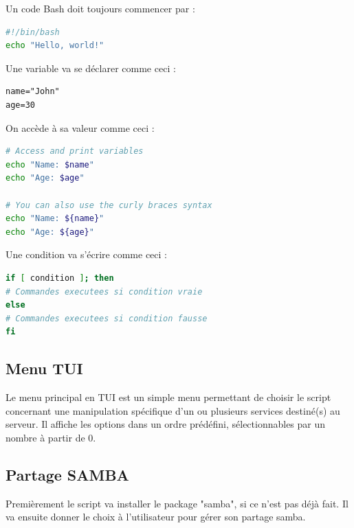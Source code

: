 \documentclass{article}
\begin{document}
	\begin{center}
	Un code Bash doit toujours commencer par :
\end{center}
\begin{lstlisting}[language=bash, label={lst:bash-script}]
#!/bin/bash
echo "Hello, world!"
\end{lstlisting}
	
	\begin{center}
		Une variable va se déclarer comme ceci :
	\end{center}
	\begin{lstlisting}
name="John"
age=30
	\end{lstlisting}

	\begin{center}
On accède à sa valeur comme ceci :
\end{center}

\begin{lstlisting}[language=bash, label={lst:bash-script}]
# Access and print variables
echo "Name: $name"
echo "Age: $age"

# You can also use the curly braces syntax
echo "Name: ${name}"
echo "Age: ${age}"
\end{lstlisting}

\begin{center}
	Une condition va s'écrire comme ceci :
\end{center}
	
\begin{lstlisting}[language=bash, label={lst:bash-script}]
if [ condition ]; then
# Commandes executees si condition vraie
else
# Commandes executees si condition fausse
fi

\end{lstlisting}
	
	\subsection{Menu TUI}
	Le menu principal en TUI est un simple menu permettant de choisir le script concernant une manipulation spécifique d'un ou plusieurs services destiné(s) au serveur.
	Il affiche les options dans un ordre prédéfini, sélectionnables par un nombre à partir de 0.
	\subsection{Partage SAMBA}
	Premièrement le script va installer le package "samba", si ce n'est pas déjà fait.
	Il va ensuite donner le choix à l'utilisateur pour gérer son partage samba.
	 
\end{document}
